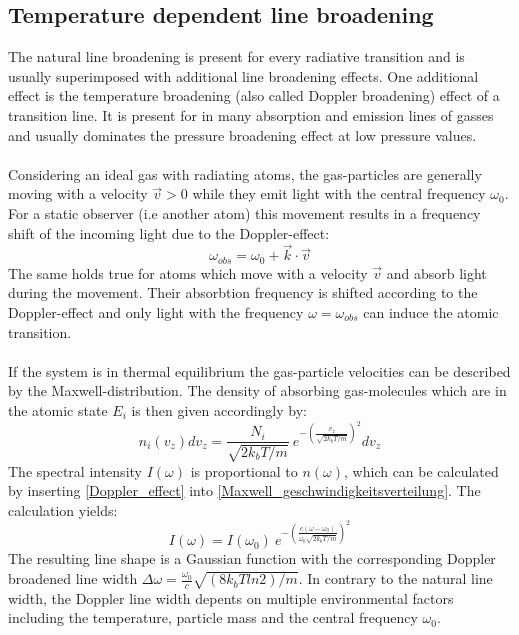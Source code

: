 \subsection{Temperature dependent line broadening}
The natural line broadening is present for every radiative transition and is usually superimposed with additional line broadening effects. One additional effect is the temperature broadening (also called Doppler broadening) effect of a transition line. It is present for in many absorption and emission lines of gasses and usually dominates the pressure broadening effect at low pressure values. \\ \\
Considering an ideal gas with radiating atoms, the gas-particles are generally moving with a velocity $\vec{v} > 0$ while they emit light with the central frequency $\omega_0$. For a static observer (i.e another atom) this movement results in a frequency shift of the incoming light due to the Doppler-effect:
\begin{equation}
\omega_{obs}= \omega_0 +\vec{k} \cdot \vec{v}
\label{Doppler_effect}
\end{equation}
The same holds true for atoms which move with a velocity $\vec{v}$ and absorb light during the movement. Their absorbtion frequency is shifted according to the Doppler-effect and only light with the frequency $\omega=\omega_{obs}$ can induce the atomic transition. \\ \\ If the system is in thermal equilibrium the gas-particle velocities can be described by the Maxwell-distribution. The density of absorbing gas-molecules which are in the atomic state $E_i$ is then given accordingly by:
\begin{equation}
n_i(v_z)dv_z = \frac{N_i}{\sqrt{2k_bT/m}} \ e^{-(\frac{v_z}{\sqrt{2k_bT/m}})^2}dv_z
\label{Maxwell_geschwindigkeitsverteilung}
\end{equation}
The spectral intensity $I(\omega)$ is proportional to $n(\omega)$, which can be calculated by inserting \ref{Doppler_effect} into \ref{Maxwell_geschwindigkeitsverteilung}. The calculation yields:
\begin{equation}
I(\omega)=I(\omega_0) \ e^{-\left(\frac{c(\omega-\omega_0)}{\omega_0\sqrt{2k_bT/m}}\right)^2}
\label{Doppler_verbreiterung}
\end{equation}
The resulting line shape is a Gaussian function with the corresponding Doppler broadened line width $\Delta \omega = \frac{\omega_0}{c}\sqrt{(8k_bTln2)/m}$. In contrary to the natural line width, the Doppler line width depents on multiple environmental factors including the temperature, particle mass and the central frequency $\omega_0$. 



